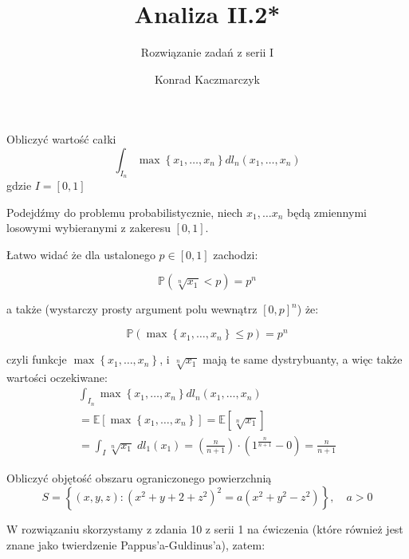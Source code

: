 \documentclass[11pt]{scrartcl}
\author{Konrad Kaczmarczyk}
\begin{document}
    \title{Analiza II.2*}
    \subtitle{Rozwiązanie zadań z serii I}
    \maketitle
    \begin{zadanie*}
        Obliczyć wartość całki
        \[
            \int_{I_n} \max \left \{ x_1, \dots, x_n \right \} dl_n \left ( x_1, \dots , x_n \right )
        \]
        gdzie $I = [0,1]$
    \end{zadanie*}

    Podejdźmy do problemu probabilistycznie, niech $x_1, \dots x_n$ będą zmiennymi losowymi wybieranymi z zakeresu $[0,1]$.

    Łatwo widać że dla ustalonego $p \in [0,1]$ zachodzi:

    \[
        \mathbb{P} \left ( \sqrt[n]{x_1} < p   \right ) = p^n
    \]

    a także (wystarczy prosty argument polu wewnątrz $[0,p]^n$) że:

    \[
        \mathbb{P} \left ( \max \left \{ x_1, \dots, x_n  \right \} \leq p \right ) = p^n
    \]

    czyli funkcje $\max \left \{ x_1, \dots, x_n \right \}$, i $\sqrt[n]{x_1} $ mają te same dystrybuanty, a więc także wartości oczekiwane:
     \begin{gather*}
        \int_{I_n} \max \left \{ x_1, \dots, x_n \right \} dl_n \left ( x_1, \dots , x_n \right ) \\
        = \mathbb{E} \left [ \max \left \{ x_1, \dots, x_n \right \} \right ]
        = \mathbb{E} \left [ \sqrt[n]{x_1}  \right ] \\
        = \int_{I} \sqrt[n]{x_1} \; dl_1 (x_1) 
        = \left ( \frac{n}{n + 1} \right ) \cdot \left ( 1^{\frac{n}{n + 1}} - 0 \right ) = \frac{n}{n + 1}  
     \end{gather*}

     \newpage

     \begin{zadanie*}
        Obliczyć objętość obszaru ograniczonego powierzchnią
        \[
            S = \left \{ (x, y, z) : \left ( x^2 + y+2 + z^2 \right )^2 = a \left ( x^2 + y^2 - z^2 \right ) \right \}, \quad a > 0
        \]
     \end{zadanie*}

     W rozwiązaniu skorzystamy z zdania 10 z serii 1 na ćwiczenia (które również jest znane jako twierdzenie Pappus'a-Guldinus'a), zatem:
\end{document}
